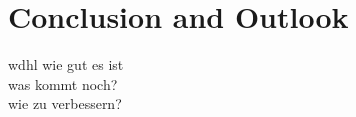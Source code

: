 \section{Conclusion and Outlook}
\label{sec:conclusion}
wdhl wie gut es ist\\
was kommt noch?\\
wie zu verbessern?